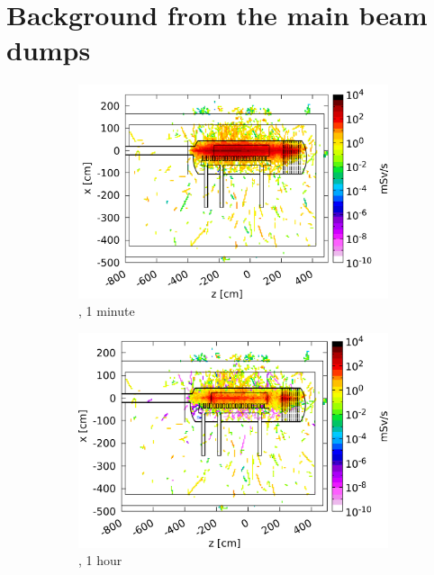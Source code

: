 \chapter{Background from the main beam dumps}
\label{Appendix:BeamDump}
\begin{figure}[!h]
 \centering
  \begin{subfigure}[b]{0.32\textwidth}
   \centering
    \includegraphics[width=\textwidth]{Figures/BeamDump/Design1_1.png}
   \caption{\designone, 1 minute}
   \end{subfigure}
   \hfill
    \begin{subfigure}[b]{0.32\textwidth}
   \centering
    \includegraphics[width=\textwidth]{Figures/BeamDump/Design1_2.png}
   \caption{\designone, 1 hour}
   \end{subfigure}
      \hfill
     \begin{subfigure}[b]{0.32\textwidth}

\end{subfigure}
\end{figure}
